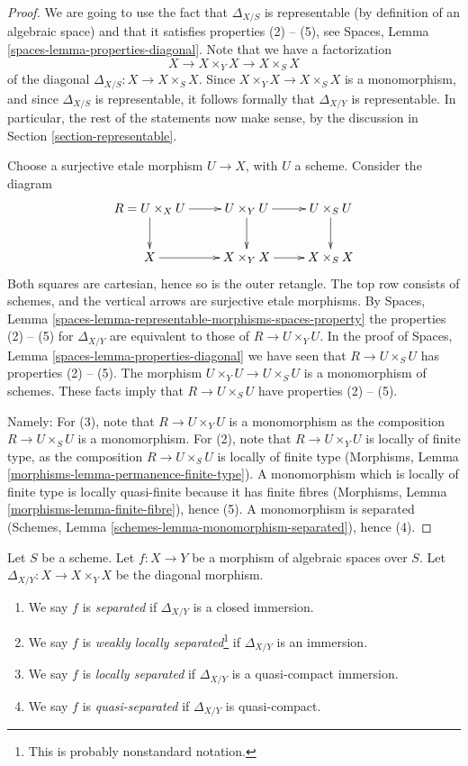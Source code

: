 \begin{proof}
We are going to use the fact that $\Delta_{X/S}$ is
representable (by definition of an algebraic space) and that
it satisfies properties (2) -- (5), see
Spaces, Lemma \ref{spaces-lemma-properties-diagonal}.
Note that we have a factorization
$$
X
\longrightarrow
X \times_Y X
\longrightarrow
X \times_S X
$$
of the diagonal $\Delta_{X/S} : X \to X \times_S X$. Since
$X \times_Y X \to X \times_S X$ is a monomorphism, and since
$\Delta_{X/S}$ is representable, it follows formally that
$\Delta_{X/Y}$ is representable. In particular, the rest of
the statements now make sense, by the discussion in
Section \ref{section-representable}.

\medskip\noindent
Choose a surjective etale morphism $U \to X$, with $U$ a scheme.
Consider the diagram
$$
\xymatrix{
R = U \times_X U \ar[r] \ar[d] &
U \times_Y U \ar[d] \ar[r] &
U \times_S U \ar[d] \\
X \ar[r] & X \times_Y X \ar[r] & X \times_S X
}
$$
Both squares are cartesian, hence so is the outer retangle.
The top row consists of schemes, and the vertical arrows
are surjective etale morphisms. By
Spaces, Lemma \ref{spaces-lemma-representable-morphisms-spaces-property}
the properties (2) -- (5) for $\Delta_{X/Y}$ are equivalent to those of
$R \to U \times_Y U$. In the proof of
Spaces, Lemma \ref{spaces-lemma-properties-diagonal}
we have seen that $R \to U \times_S U$ has properties (2) -- (5).
The morphism $U \times_Y U \to U \times_S U$ is a monomorphism
of schemes. These facts imply that $R \to U \times_S U$ have
properties (2) -- (5).

\medskip\noindent
Namely: For (3), note that $R \to U \times_Y U$
is a monomorphism as the composition
$R \to U \times_S U$ is a monomorphism. For (2), note that
$R \to U \times_Y U$ is locally of finite type, as the
composition $R \to U \times_S U$ is locally of finite type
(Morphisms, Lemma \ref{morphisms-lemma-permanence-finite-type}).
A monomorphism which is locally of finite type is locally quasi-finite
because it has finite fibres
(Morphisms, Lemma \ref{morphisms-lemma-finite-fibre}), hence (5).
A monomorphism is separated
(Schemes, Lemma \ref{schemes-lemma-monomorphism-separated}), hence (4).
\end{proof}

\begin{definition}
\label{definition-separated}
Let $S$ be a scheme.
Let $f : X \to Y$ be a morphism of algebraic spaces over $S$.
Let $\Delta_{X/Y} : X \to X \times_Y X$ be the diagonal morphism.
\begin{enumerate}
\item We say $f$ is {\it separated} if $\Delta_{X/Y}$ is a closed immersion.
\item We say $f$ is {\it weakly locally separated}\footnote{This is probably
nonstandard notation.} if $\Delta_{X/Y}$ is an immersion.
\item We say $f$ is {\it locally separated} if $\Delta_{X/Y}$ is a
quasi-compact immersion.
\item We say $f$ is {\it quasi-separated} if $\Delta_{X/Y}$ is quasi-compact.
\end{enumerate}
\end{definition}

